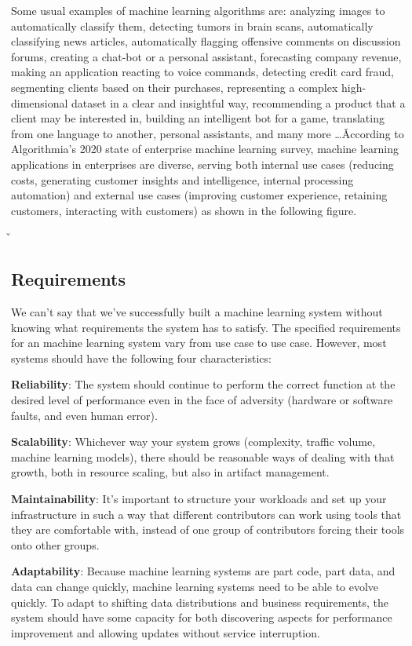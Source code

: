 Some usual examples of machine learning algorithms are: analyzing images to automatically classify them, detecting
tumors in brain scans, automatically classifying news articles, automatically flagging offensive comments on
discussion forums, creating a chat-bot or a personal assistant, forecasting company revenue, making an application
reacting to voice commands, detecting credit card fraud, segmenting clients based on their purchases, representing a
complex high-dimensional dataset in a clear and insightful way, recommending a product that a client may be
interested in, building an intelligent bot for a game, translating from one language to another, personal assistants,
and many more \ldots \v

According to Algorithmia's 2020 state of enterprise machine learning survey, machine learning applications in 
enterprises are diverse, serving both internal use cases (reducing costs, generating customer insights and intelligence, 
internal processing automation) and external use cases (improving customer experience, retaining customers, interacting 
with customers) as shown in the following figure.

\v


\subsection{Requirements}

We can't say that we've successfully built a machine learning system without knowing what requirements the system has
to satisfy. The specified requirements for an machine learning system vary from use case to use case. However, most
systems should have the following four characteristics:
\bit
\item \textbf{Reliability}: The system should continue to perform the correct function at the desired level of
performance even in the face of adversity (hardware or software faults, and even human error).
\item \textbf{Scalability}: Whichever way your system grows (complexity, traffic volume, machine learning models),
there should be reasonable ways of dealing with that growth, both in resource scaling, but also in artifact management.
\item \textbf{Maintainability}: It's important to structure your workloads and set up your infrastructure in such a
way that different contributors can work using tools that they are comfortable with, instead of one group of
contributors forcing their tools onto other groups.
\item \textbf{Adaptability}: Because machine learning systems are part code, part data, and data can change quickly,
machine learning systems need to be able to evolve quickly. To adapt to shifting data distributions and business
requirements, the system should have some capacity for both discovering aspects for performance improvement and
allowing updates without service interruption.
\eit

